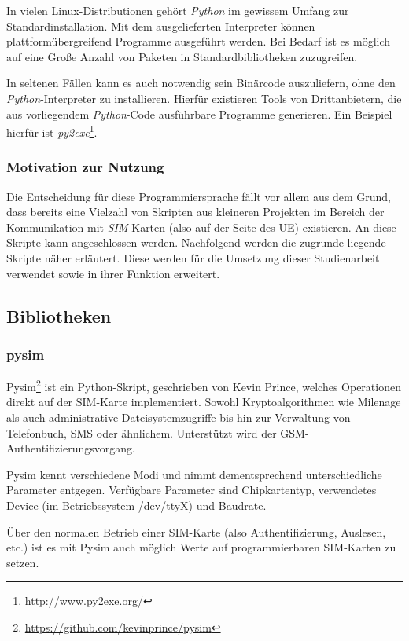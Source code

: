 In vielen Linux-Distributionen gehört \textit{Python} im gewissem Umfang zur Standardinstallation.
Mit dem ausgelieferten Interpreter können plattformübergreifend Programme ausgeführt werden. Bei
Bedarf ist es möglich auf eine Große Anzahl von Paketen in Standardbibliotheken zuzugreifen.

In seltenen Fällen kann es auch notwendig sein Binärcode auszuliefern, ohne den
\textit{Python}-Interpreter zu installieren. Hierfür existieren Tools von Drittanbietern,
die aus vorliegendem \textit{Python}-Code ausführbare Programme generieren. Ein Beispiel hierfür
ist \textit{py2exe}\footnote{\url{http://www.py2exe.org/}}.

\subsubsection{Motivation zur Nutzung}
Die Entscheidung für diese Programmiersprache fällt vor allem aus dem Grund, dass bereits eine
Vielzahl von Skripten aus kleineren Projekten im Bereich der Kommunikation mit \textit{SIM}-Karten
(also auf der Seite des UE) existieren. An diese Skripte kann angeschlossen werden. Nachfolgend werden die zugrunde liegende
Skripte näher erläutert. Diese werden für die Umsetzung dieser Studienarbeit verwendet sowie
in ihrer Funktion erweitert.

\subsection{Bibliotheken}
\subsubsection{pysim}
\label{subsec:pysim}
Pysim\footnote{\url{https://github.com/kevinprince/pysim}} ist ein
Python-Skript, geschrieben von Kevin Prince,
welches Operationen direkt auf der SIM-Karte implementiert.
Sowohl Kryptoalgorithmen wie Milenage als auch administrative Dateisystemzugriffe
bis hin zur Verwaltung von Telefonbuch, SMS oder ähnlichem.
Unterstützt wird der GSM-Authentifizierungsvorgang.

Pysim kennt verschiedene Modi und nimmt dementsprechend unterschiedliche
Parameter entgegen. Verfügbare Parameter sind Chipkartentyp, verwendetes
Device (im Betriebssystem /dev/ttyX) und Baudrate\cite{pysimprince}.

Über den normalen Betrieb einer SIM-Karte (also Authentifizierung, Auslesen, etc.)
ist es mit Pysim auch möglich Werte auf programmierbaren SIM-Karten zu setzen.

